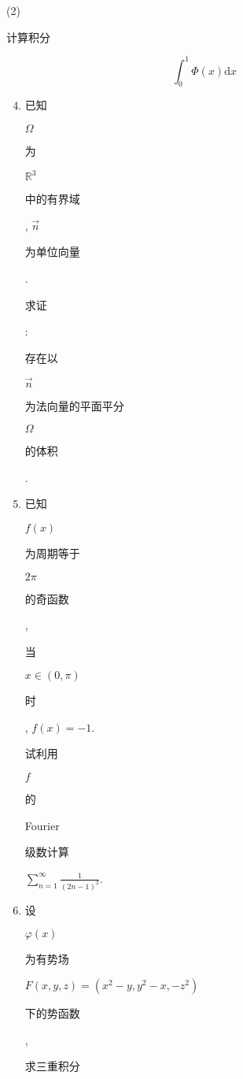 \documentclass[10pt]{article}
\begin{document}
(2) \begin{CJK}{UTF8}{mj}计算积分\end{CJK}
$$
\int_{0}^{1} \Phi(x) \mathrm{d} x
$$

\begin{enumerate}
  \setcounter{enumi}{3}
  \item \begin{CJK}{UTF8}{mj}已知\end{CJK} $\Omega$ \begin{CJK}{UTF8}{mj}为\end{CJK} $\mathbb{R}^{3}$ \begin{CJK}{UTF8}{mj}中的有界域\end{CJK}, $\vec{n}$ \begin{CJK}{UTF8}{mj}为单位向量\end{CJK}. \begin{CJK}{UTF8}{mj}求证\end{CJK}: \begin{CJK}{UTF8}{mj}存在以\end{CJK} $\vec{n}$ \begin{CJK}{UTF8}{mj}为法向量的平面平分\end{CJK} $\Omega$ \begin{CJK}{UTF8}{mj}的体积\end{CJK}.

  \item \begin{CJK}{UTF8}{mj}已知\end{CJK} $f(x)$ \begin{CJK}{UTF8}{mj}为周期等于\end{CJK} $2 \pi$ \begin{CJK}{UTF8}{mj}的奇函数\end{CJK}, \begin{CJK}{UTF8}{mj}当\end{CJK} $x \in(0, \pi)$ \begin{CJK}{UTF8}{mj}时\end{CJK}, $f(x)=-1$. \begin{CJK}{UTF8}{mj}试利用\end{CJK} $f$ \begin{CJK}{UTF8}{mj}的\end{CJK} Fourier \begin{CJK}{UTF8}{mj}级数计算\end{CJK} $\sum_{n=1}^{\infty} \frac{1}{(2 n-1)^{2}}$.

  \item \begin{CJK}{UTF8}{mj}设\end{CJK} $\varphi(x)$ \begin{CJK}{UTF8}{mj}为有势场\end{CJK} $F(x, y, z)=\left(x^{2}-y, y^{2}-x,-z^{2}\right)$ \begin{CJK}{UTF8}{mj}下的势函数\end{CJK}, \begin{CJK}{UTF8}{mj}求三重积分\end{CJK}

\end{enumerate}
\end{document}

